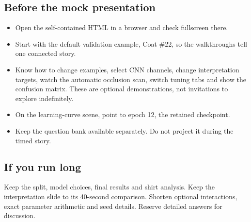 \documentclass[11pt,a4paper]{article}
\newcounter{question}
\begin{document}
\subsection{Before the mock presentation}
\begin{itemize}
\item Open the self-contained HTML in a browser and check fullscreen there.
\item Start with the default validation example, Coat \#22, so the walkthroughs tell one connected story.
\item Know how to change examples, select CNN channels, change interpretation targets, watch the automatic occlusion scan, switch tuning tabs and show the confusion matrix. These are optional demonstrations, not invitations to explore indefinitely.
\item On the learning-curve scene, point to epoch 12, the retained checkpoint.
\item Keep the question bank available separately. Do not project it during the timed story.
\end{itemize}
\subsection{If you run long}
Keep the split, model choices, final results and shirt analysis. Keep the interpretation slide to its 40-second comparison. Shorten optional interactions, exact parameter arithmetic and seed details. Reserve detailed answers for discussion.
\end{document}
